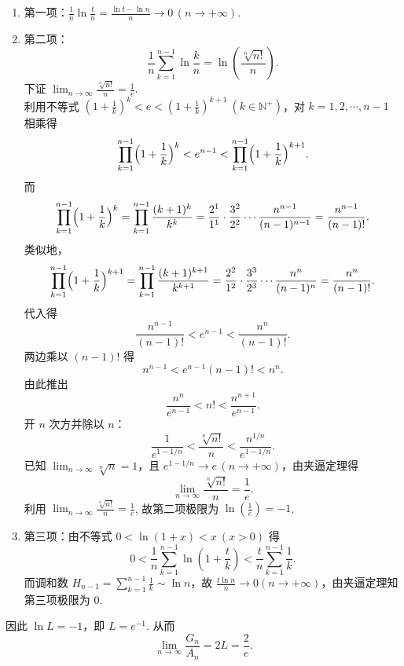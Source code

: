 \begin{enumerate}
\begin{solution}
\[        \]
        \begin{enumerate}
        \item[i.] 第一项：\(\displaystyle\frac{1}{n}\ln\frac{t}{n} = \frac{\ln t - \ln n}{n} \to 0\,(n\to+\infty)\).
        \item[ii.] 第二项：
        \[
        \frac{1}{n}\sum_{k=1}^{n-1}\ln\frac{k}{n} = \ln\!\left(\frac{\sqrt[n]{n!}}{n}\right).
        \]
        下证 \(\displaystyle\lim_{n\to\infty}\frac{\sqrt[n]{n!}}{n} = \frac{1}{e}\).\\
        利用不等式 \(\displaystyle \left(1+\frac{1}{k}\right)^k < e < \left(1+\frac{1}{k}\right)^{k+1}\ (k\in\mathbb{N}^+)\)，对 \(k=1,2,\cdots,n-1\) 相乘得
        \[
        \prod_{k=1}^{n-1}\Bigl(1+\frac{1}{k}\Bigr)^k < e^{n-1} < \prod_{k=1}^{n-1}\Bigl(1+\frac{1}{k}\Bigr)^{k+1}.
        \]
        而
        \[
        \prod_{k=1}^{n-1}\Bigl(1+\frac{1}{k}\Bigr)^k = \prod_{k=1}^{n-1}\frac{(k+1)^k}{k^k} = \frac{2^1}{1^1}\cdot\frac{3^2}{2^2}\cdots\frac{n^{n-1}}{(n-1)^{n-1}} = \frac{n^{n-1}}{(n-1)!}.
        \]
        类似地，
        \[
        \prod_{k=1}^{n-1}\Bigl(1+\frac{1}{k}\Bigr)^{k+1} = \prod_{k=1}^{n-1}\frac{(k+1)^{k+1}}{k^{k+1}} = \frac{2^2}{1^2}\cdot\frac{3^3}{2^3}\cdots\frac{n^{n}}{(n-1)^{n}} = \frac{n^{n}}{(n-1)!}.
        \]
        代入得
        \[
        \frac{n^{n-1}}{(n-1)!} < e^{n-1} < \frac{n^{n}}{(n-1)!}.
        \]
        两边乘以 \((n-1)!\) 得
        \[
        n^{n-1} < e^{n-1}(n-1)! < n^{n}.
        \]
        由此推出
        \[
        \frac{n^{n}}{e^{n-1}} < n! < \frac{n^{n+1}}{e^{n-1}}.
        \]
        开 \(n\) 次方并除以 \(n\)：
        \[
        \frac{1}{e^{1-1/n}} < \frac{\sqrt[n]{n!}}{n} < \frac{n^{1/n}}{e^{1-1/n}}.
        \]
        已知 \(\displaystyle \lim_{n\to\infty} \sqrt[n]{n} = 1\)，且 \(\displaystyle e^{1-1/n} \to e\,(n\to+\infty)\)，由夹逼定理得
        \[
        \lim_{n\to\infty}\frac{\sqrt[n]{n!}}{n} = \frac{1}{e}.
        \]
        利用 \(\displaystyle\lim_{n\to\infty}\frac{\sqrt[n]{n!}}{n} = \frac{1}{e}\), 故第二项极限为 \(\displaystyle\ln\left(\frac{1}{e}\right) = -1\).
        \item[iii.] 第三项：由不等式 \(0 < \ln(1+x) < x\ (x>0)\) 得
        \[
        0 < \frac{1}{n}\sum_{k=1}^{n-1}\ln\!\left(1+\frac{t}{k}\right) < \frac{t}{n}\sum_{k=1}^{n-1}\frac{1}{k}.
        \]
        而调和数 \(\displaystyle H_{n-1} = \sum_{k=1}^{n-1}\frac{1}{k} \sim \ln n\)，故 \(\displaystyle \frac{t\ln n}{n} \to 0(n\to+\infty)\)，由夹逼定理知第三项极限为 \(0\).
        \end{enumerate}
        因此 \(\ln L = -1\)，即 \(L = e^{-1}\). 从而
        \[
        \lim_{n\to\infty}\frac{G_n}{A_n} = 2L = \frac{2}{e}.
        \]
    \end{solution}


\end{enumerate}
